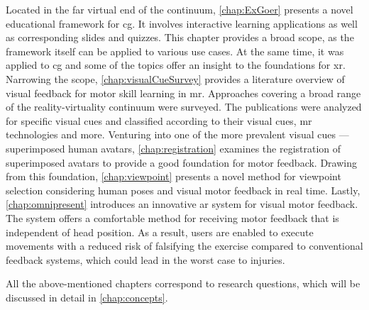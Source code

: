 Located in the far virtual end of the continuum, \autoref{chap:ExGoer} presents a novel educational framework for \Acrfull{cg}.
It involves interactive learning applications as well as corresponding slides and quizzes.
This chapter provides a broad scope, as the framework itself can be applied to various use cases.
At the same time, it was applied to \acrshort{cg} and some of the topics offer an insight to the foundations for \acrshort{xr}.
Narrowing the scope, \autoref{chap:visualCueSurvey} provides a literature overview of visual feedback for motor skill learning in \acrshort{mr}.
Approaches covering a broad range of the reality-virtuality continuum were surveyed.
The publications were analyzed for specific visual cues and classified according to their visual cues, \acrshort{mr} technologies and more.
Venturing into one of the more prevalent visual cues --- superimposed human avatars, \autoref{chap:registration} examines the registration of superimposed avatars to provide a good foundation for motor feedback.
Drawing from this foundation, \autoref{chap:viewpoint} presents a novel method for viewpoint selection considering human poses and visual motor feedback in real time.
Lastly, \autoref{chap:omnipresent} introduces an innovative \acrshort{ar} system for visual motor feedback.
The system offers a comfortable method for receiving motor feedback that is independent of head position.
As a result, users are enabled to execute movements with a reduced risk of falsifying the exercise compared to conventional feedback systems, which could lead in the worst case to injuries.

All the above-mentioned chapters correspond to research questions, which will be discussed in detail in \autoref{chap:concepts}.


